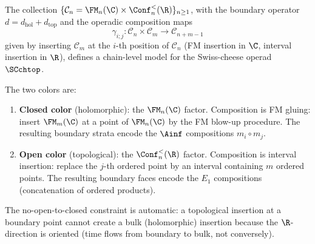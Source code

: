 \begin{theorem}
The collection
$\{\mathcal{C}_n = \FM_n(\C) \times \Conf_n^<(\R)\}_{n \ge 1}$,
with the boundary operator $d = d_{\mathrm{hol}}
+ d_{\mathrm{top}}$ and the operadic composition maps
\begin{equation}%
\gamma_{i;j} : \mathcal{C}_n \times \mathcal{C}_m
\longrightarrow \mathcal{C}_{n+m-1}
\end{equation}
given by inserting $\mathcal{C}_m$ at the $i$-th
position of $\mathcal{C}_n$ (FM insertion in $\C$,
interval insertion in $\R$), defines a chain-level
model for the Swiss-cheese operad $\SCchtop$.

The two colors are:
\begin{enumerate}[label=\textup{(\roman*)}]
\item \textbf{Closed color} (holomorphic): the
 $\FM_n(\C)$ factor. Composition is FM gluing:
 insert $\FM_m(\C)$ at a point of $\FM_n(\C)$ by
 the FM blow-up procedure. The resulting boundary
 strata encode the $\Ainf$ compositions $m_i \circ m_j$.

\item \textbf{Open color} (topological): the
 $\Conf_n^<(\R)$ factor. Composition is interval
 insertion: replace the $j$-th ordered point by an
 interval containing $m$ ordered points. The resulting
 boundary faces encode the $E_1$ compositions
 (concatenation of ordered products).
\end{enumerate}

The no-open-to-closed constraint is automatic: a
topological insertion at a boundary point cannot
create a bulk (holomorphic) insertion because the
$\R$-direction is oriented (time flows from boundary
to bulk, not conversely).
\end{theorem}

